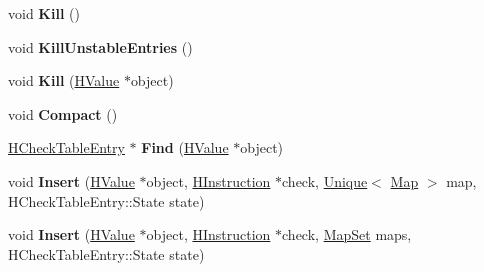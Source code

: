 \begin{DoxyCompactItemize}
\item 
void {\bfseries Kill} ()\hypertarget{classv8_1_1internal_1_1_h_check_table_a278aa876ed04ebab89760689dde00605}{}\label{classv8_1_1internal_1_1_h_check_table_a278aa876ed04ebab89760689dde00605}

\item 
void {\bfseries Kill\+Unstable\+Entries} ()\hypertarget{classv8_1_1internal_1_1_h_check_table_a74fad6dcde318552fee2df4cc236d5ae}{}\label{classv8_1_1internal_1_1_h_check_table_a74fad6dcde318552fee2df4cc236d5ae}

\item 
void {\bfseries Kill} (\hyperlink{classv8_1_1internal_1_1_h_value}{H\+Value} $\ast$object)\hypertarget{classv8_1_1internal_1_1_h_check_table_a18c538d25756ffe92f4d710f920d2c26}{}\label{classv8_1_1internal_1_1_h_check_table_a18c538d25756ffe92f4d710f920d2c26}

\item 
void {\bfseries Compact} ()\hypertarget{classv8_1_1internal_1_1_h_check_table_afe9d11183a7bcc13638537013079aadd}{}\label{classv8_1_1internal_1_1_h_check_table_afe9d11183a7bcc13638537013079aadd}

\item 
\hyperlink{structv8_1_1internal_1_1_h_check_table_entry}{H\+Check\+Table\+Entry} $\ast$ {\bfseries Find} (\hyperlink{classv8_1_1internal_1_1_h_value}{H\+Value} $\ast$object)\hypertarget{classv8_1_1internal_1_1_h_check_table_a525e7d44bda371c159d199a2ee89bea6}{}\label{classv8_1_1internal_1_1_h_check_table_a525e7d44bda371c159d199a2ee89bea6}

\item 
void {\bfseries Insert} (\hyperlink{classv8_1_1internal_1_1_h_value}{H\+Value} $\ast$object, \hyperlink{classv8_1_1internal_1_1_h_instruction}{H\+Instruction} $\ast$check, \hyperlink{classv8_1_1internal_1_1_unique}{Unique}$<$ \hyperlink{classv8_1_1internal_1_1_map}{Map} $>$ map, H\+Check\+Table\+Entry\+::\+State state)\hypertarget{classv8_1_1internal_1_1_h_check_table_ae3938d8c4f638693306bed0a946d785d}{}\label{classv8_1_1internal_1_1_h_check_table_ae3938d8c4f638693306bed0a946d785d}

\item 
void {\bfseries Insert} (\hyperlink{classv8_1_1internal_1_1_h_value}{H\+Value} $\ast$object, \hyperlink{classv8_1_1internal_1_1_h_instruction}{H\+Instruction} $\ast$check, \hyperlink{classv8_1_1internal_1_1_unique_set}{Map\+Set} maps, H\+Check\+Table\+Entry\+::\+State state)\hypertarget{classv8_1_1internal_1_1_h_check_table_a083f82c83c1b08d7a3583bb96671da8d}{}\label{classv8_1_1internal_1_1_h_check_table_a083f82c83c1b08d7a3583bb96671da8d}


\end{DoxyCompactItemize}
